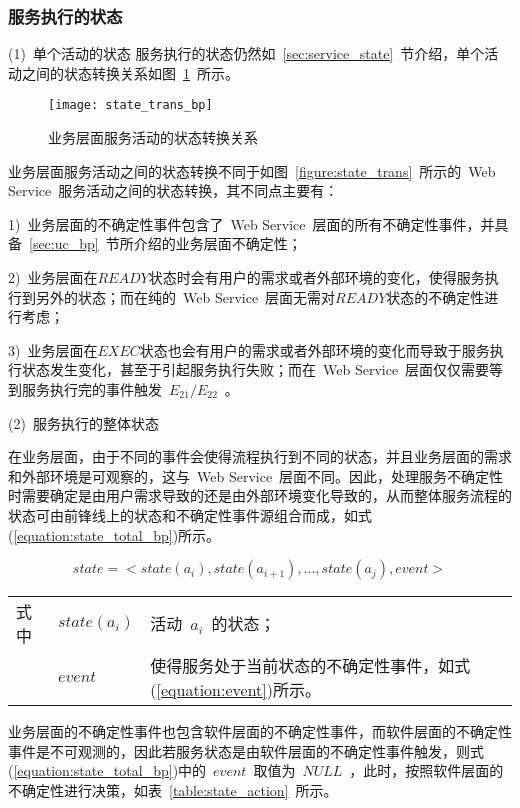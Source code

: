 \subsubsection{服务执行的状态}

(1)~单个活动的状态
服务执行的状态仍然如~\ref{sec:service_state}~节介绍，单个活动之间的状态转换关系如图~\ref{figure:state_trans_pb}~所示。

\begin{figure}[htbp]
    \centering
    \texttt{[image: state\_trans\_bp]}
    \caption{业务层面服务活动的状态转换关系}\label{figure:state_trans_pb}
    \vspace{-1em}
\end{figure}

业务层面服务活动之间的状态转换不同于如图~\ref{figure:state_trans}~所示的~Web Service~服务活动之间的状态转换，其不同点主要有：

1)~业务层面的不确定性事件包含了~Web Service~层面的所有不确定性事件，并具备~\ref{sec:uc_bp}~节所介绍的业务层面不确定性；

2)~业务层面在$READY$状态时会有用户的需求或者外部环境的变化，使得服务执行到另外的状态；而在纯的~Web Service~层面无需对$READY$状态的不确定性进行考虑；

3)~业务层面在$EXEC$状态也会有用户的需求或者外部环境的变化而导致于服务执行状态发生变化，甚至于引起服务执行失败；而在~Web Service~层面仅仅需要等到服务执行完的事件触发~$E_{21}/E_{22}$~。

(2)~服务执行的整体状态

在业务层面，由于不同的事件会使得流程执行到不同的状态，并且业务层面的需求和外部环境是可观察的，这与~Web Service~层面不同。因此，处理服务不确定性时需要确定是由用户需求导致的还是由外部环境变化导致的，从而整体服务流程的状态可由前锋线上的状态和不确定性事件源组合而成，如式(\ref{equation:state_total_bp})所示。

\begin{equation}\label{equation:state_total_bp}
state = < state(a_i),state(a_{i+1}),..., state(a_j), event >
\end{equation}
\begin{tabularx}{\textwidth}{@{}l@{\quad}l@{\pozhehao }X@{}}
    式中
    & $state(a_i)$ & 活动~$a_i$~的状态；\\
    & $event$ & 使得服务处于当前状态的不确定性事件，如式(\ref{equation:event})所示。
\end{tabularx}\vspace{\wordsep}

业务层面的不确定性事件也包含软件层面的不确定性事件，而软件层面的不确定性事件是不可观测的，因此若服务状态是由软件层面的不确定性事件触发，则式(\ref{equation:state_total_bp})中的~$event$~取值为~$NULL$~，此时，按照软件层面的不确定性进行决策，如表~\ref{table:state_action}~所示。

